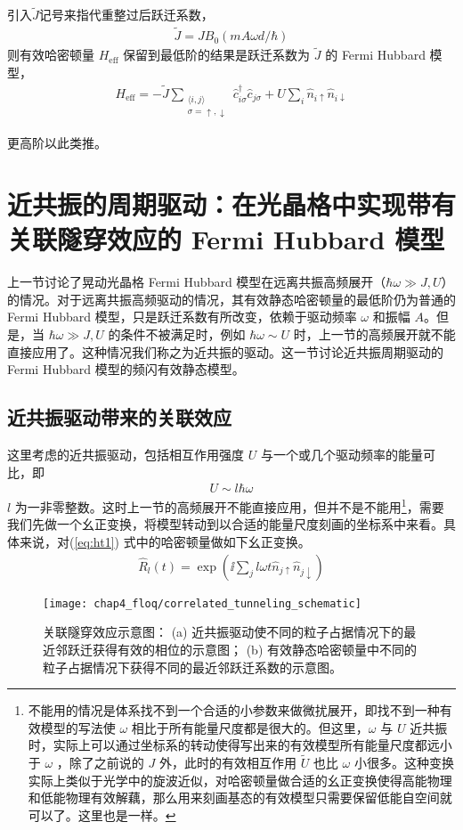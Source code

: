 引入$\tilde{J}$记号来指代重整过后跃迁系数，
\begin{align}
\tilde{J} = JB_0(mA\omega d/\hbar) 
\end{align}
则有效哈密顿量 $H_{\text{eff}}$ 保留到最低阶的结果是跃迁系数为 $\tilde{J}$ 的 Fermi Hubbard 模型，
\begin{align}
H_{\text{eff}} = -\tilde{J} \sum_{\substack{\langle i,j\rangle \\ \sigma = \uparrow,\downarrow}} \hat{c}_{i\sigma}^{\dagger}\hat{c}_{j\sigma}+U\sum_i\hat{n}_{i\uparrow}\hat{n}_{i\downarrow}
\end{align}

更高阶以此类推。





\section{近共振的周期驱动：在光晶格中实现带有关联隧穿效应的 Fermi Hubbard 模型}\label{sec:floq:resona}

上一节讨论了晃动光晶格 Fermi Hubbard 模型在远离共振高频展开（$\hbar\omega\gg J, U$）的情况。对于远离共振高频驱动的情况，其有效静态哈密顿量的最低阶仍为普通的 Fermi Hubbard 模型，只是跃迁系数有所改变，依赖于驱动频率 $\omega$ 和振幅 $A$。但是，当 $\hbar\omega\gg J, U$ 的条件不被满足时，例如 $\hbar\omega\sim U$ 时，上一节的高频展开就不能直接应用了。这种情况我们称之为近共振的驱动。这一节讨论近共振周期驱动的 Fermi Hubbard 模型的频闪有效静态模型。

\subsection{近共振驱动带来的关联效应}
这里考虑的近共振驱动，包括相互作用强度 $U$ 与一个或几个驱动频率的能量可比，即
\begin{align}
U\sim l\hbar\omega
\end{align}
$l$ 为一非零整数。这时上一节的高频展开不能直接应用，但并不是不能用\footnote{不能用的情况是体系找不到一个合适的小参数来做微扰展开，即找不到一种有效模型的写法使 $\omega$ 相比于所有能量尺度都是很大的。但这里，$\omega$ 与 $U$ 近共振时，实际上可以通过坐标系的转动使得写出来的有效模型所有能量尺度都远小于 $\omega$ ，除了之前说的 $J$ 外，此时的有效相互作用 $\tilde{U}$ 也比 $\omega$ 小很多。这种变换实际上类似于光学中的旋波近似，对哈密顿量做合适的幺正变换使得高能物理和低能物理有效解藕，那么用来刻画基态的有效模型只需要保留低能自空间就可以了。这里也是一样。}，需要我们先做一个幺正变换，将模型转动到以合适的能量尺度刻画的坐标系中来看。具体来说，对(\ref{eq:ht1}) 式中的哈密顿量做如下幺正变换。
\begin{align}
\hat{R}_l(t) = \exp(\ii\sum_jl\omega t\hat{n}_{j\uparrow}\hat{n}_{j\downarrow})
\end{align}
\begin{figure}[t]
\centering
\texttt{[image: chap4\_floq/correlated\_tunneling\_schematic]}
\caption{关联隧穿效应示意图：
(a) 近共振驱动使不同的粒子占据情况下的最近邻跃迁获得有效的相位的示意图；
(b) 有效静态哈密顿量中不同的粒子占据情况下获得不同的最近邻跃迁系数的示意图。}
\label{fig:floq:corrtunn}
\end{figure}

